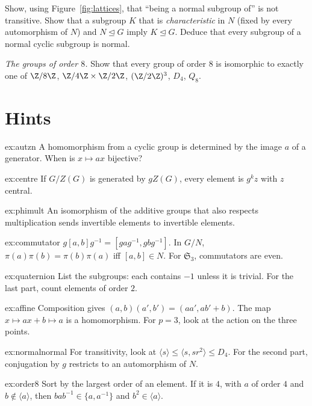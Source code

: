 \begin{exercise}[$\star\star$]\label{ex:normalnormal}
Show, using Figure~\ref{fig:lattices}, that ``being a normal subgroup of'' is not transitive. Show that a subgroup $K$ that is \emph{characteristic} in $N$ (fixed by every automorphism of $N$) and $N\trianglelefteq G$ imply $K\trianglelefteq G$. Deduce that every subgroup of a normal cyclic subgroup is normal.
\end{exercise}

\begin{exercise}[$\star\star\star$]\label{ex:order8}
\emph{The groups of order $8$.} Show that every group of order $8$ is isomorphic to exactly one of $\Z/8\Z$, $\Z/4\Z\times\Z/2\Z$, $(\Z/2\Z)^3$, $D_4$, $Q_8$.
\end{exercise}

\section{Hints}

\begin{hint}{ex:autzn}
A homomorphism from a cyclic group is determined by the image $a$ of a generator. When is $x\mapsto ax$ bijective?
\end{hint}
\begin{hint}{ex:centre}
If $G/Z(G)$ is generated by $gZ(G)$, every element is $g^kz$ with $z$ central.
\end{hint}
\begin{hint}{ex:phimult}
An isomorphism of the additive groups that also respects multiplication sends invertible elements to invertible elements.
\end{hint}
\begin{hint}{ex:commutator}
$g[a,b]g^{-1}=[gag^{-1},gbg^{-1}]$. In $G/N$, $\pi(a)\pi(b)=\pi(b)\pi(a)$ iff $[a,b]\in N$. For $\mathfrak S_3$, commutators are even.
\end{hint}
\begin{hint}{ex:quaternion}
List the subgroups: each contains $-1$ unless it is trivial. For the last part, count elements of order $2$.
\end{hint}
\begin{hint}{ex:affine}
Composition gives $(a,b)(a',b')=(aa',ab'+b)$. The map $x\mapsto ax+b\mapsto a$ is a homomorphism. For $p=3$, look at the action on the three points.
\end{hint}
\begin{hint}{ex:normalnormal}
For transitivity, look at $\langle s\rangle\le\langle s,sr^2\rangle\le D_4$. For the second part, conjugation by $g$ restricts to an automorphism of $N$.
\end{hint}
\begin{hint}{ex:order8}
Sort by the largest order of an element. If it is $4$, with $a$ of order $4$ and $b\notin\langle a\rangle$, then $bab^{-1}\in\{a,a^{-1}\}$ and $b^2\in\langle a\rangle$.
\end{hint}

